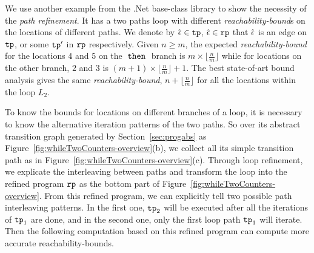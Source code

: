 \begin{example}
\label{ex:twoCounterWhile}
 We use another example from the .Net base-class library to show the necessity of the \emph{path refinement}. It has a two paths loop
 with different \emph{reachability-bound}s on the locations of different paths.
 We denote by $\hat{\mathtt{\epsilon}{}} \in \mathtt{tp}$, $\hat{\mathtt{\epsilon}{}} \in\mathtt{rp}$ that $\hat{\mathtt{\epsilon}{}}$ is an edge on $\mathtt{tp}$, or some $\mathtt{tp}'$ in $\mathtt{rp}$ respectively.
Given $n \geq m$,
the expected \emph{reachability-bound} for the locations $4$ and $5$ on the $\mathtt{\;then\;}$ branch is $m \times \lfloor\frac{n}{m}\rfloor$
while for locations on the other branch, $2$ and $3$ is $(m + 1) \times \lfloor\frac{n}{m}\rfloor + 1$. 
The best state-of-art bound analysis
gives the same \emph{reachability-bound}, $n + \lfloor\frac{n}{m}\rfloor$ for all the locations within the loop $L_2$.

To know the bounds for locations on different branches of a loop, 
it is necessary to know the alternative iteration patterns of the two paths.
So over its abstract transition graph generated by Section~\ref{sec:progabs} as Figure~\ref{fig:whileTwoCounters-overview}(b), we collect all its simple transition path as in Figure~\ref{fig:whileTwoCounters-overview}(c).
Through loop refinement, we explicate the interleaving between paths and
transform the loop into the refined program $\mathtt{rp}$ as the bottom part of Figure~\ref{fig:whileTwoCounters-overview}.
From this refined program, we can explicitly tell two possible path interleaving patterns.
In the first one, $\mathtt{tp}_2$ will be executed after all the iterations of $\mathtt{tp}_1$ are done, and in the second one,
only the first loop path $\mathtt{tp}_1$ will iterate.
Then the following computation based on this refined program can compute more accurate reachability-bounds.
\end{example}

